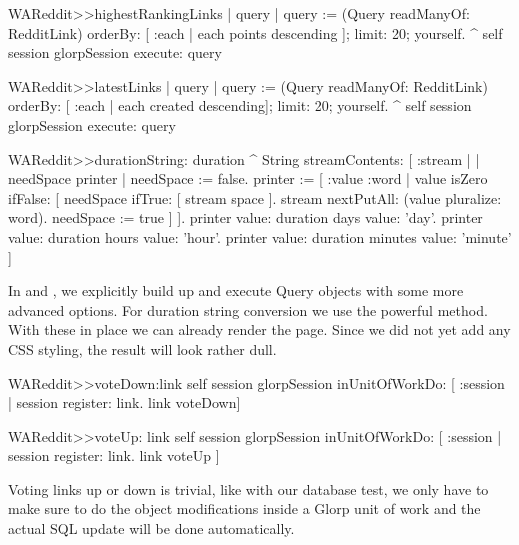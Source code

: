 \documentclass[a4paper,10pt,twoside]{book}
\begin{document}
\begin{code}{}
WAReddit>>highestRankingLinks
   | query | 
   query := (Query readManyOf: RedditLink)
              orderBy: [ :each | each points descending ]; limit: 20; yourself.
   ^ self session glorpSession execute: query
\end{code}

\begin{code}{}
WAReddit>>latestLinks
   | query | 
   query := (Query readManyOf: RedditLink)
              orderBy: [ :each | each created descending]; limit: 20; yourself.
   ^ self session glorpSession execute: query
\end{code}

\begin{code}{}
WAReddit>>durationString: duration
   ^ String streamContents: [ :stream | 
          | needSpace printer | 
          needSpace := false. 
          printer := [ :value :word |
                         value isZero ifFalse: [ 
                              needSpace ifTrue: [ stream space ]. 
                              stream nextPutAll: (value pluralize: word). 
                              needSpace := true ] ].
          printer value: duration days value: 'day'. 
          printer value: duration hours value: 'hour'. 
          printer value: duration minutes value: 'minute' ]
\end{code}

In  and , we explicitly build up and execute Query objects with some more advanced options. For duration string conversion we use the powerful  method. With these in place we can already render the page. Since we did not yet add any CSS styling, the result will look rather dull.

\begin{code}{}
WAReddit>>voteDown:link
    self session glorpSession
              inUnitOfWorkDo: [ :session | session register: link. 
                            link voteDown]
\end{code}



\begin{code}{}
WAReddit>>voteUp: link
   self session glorpSession 
      inUnitOfWorkDo: [ :session | session register: link.  link voteUp ]
\end{code}

Voting links up or down is trivial, like with our database test, we only have to make sure to do the object modifications inside a Glorp unit of work and the actual SQL update will be done automatically.
\end{document}
